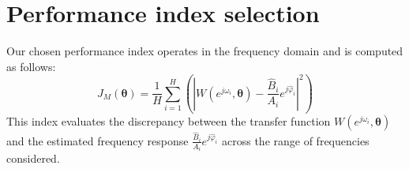 \section{Performance index selection}

Our chosen performance index operates in the frequency domain and is computed as follows:
\[J_M(\boldsymbol{\theta})=\dfrac{1}{H}\sum_{i=1}^{H}\left(\left\lvert W(e^{j\omega_i},\boldsymbol{\theta})-\dfrac{\hat{B}_i}{A_i}e^{j\hat{\varphi}_i}\right\rvert^2 \right)\]
This index evaluates the discrepancy between the transfer function $W(e^{j\omega_i},\boldsymbol{\theta})$ and the estimated frequency response $\frac{\hat{B}_i}{A_i}e^{j\hat{\varphi}_i}$ across the range of frequencies considered.